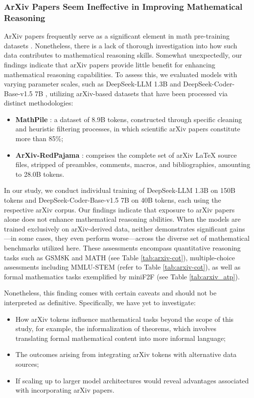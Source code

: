 \subsubsection{ArXiv Papers Seem Ineffective in Improving Mathematical Reasoning}

ArXiv papers frequently serve as a significant element in math pre-training datasets \citep{minerva,gpt-f,llemma,mathpile}. Nonetheless, there is a lack of thorough investigation into how such data contributes to mathematical reasoning skills. Somewhat unexpectedly, our findings indicate that arXiv papers provide little benefit for enhancing mathematical reasoning capabilities. To assess this, we evaluated models with varying parameter scales, such as DeepSeek-LLM 1.3B and DeepSeek-Coder-Base-v1.5 7B \citep{deepseek-coder}, utilizing arXiv-based datasets that have been processed via distinct methodologies:

\begin{itemize}[topsep=0pt]
    \item \textbf{MathPile} \citep{mathpile}: a dataset of 8.9B tokens, constructed through specific cleaning and heuristic filtering processes, in which scientific arXiv papers constitute more than 85\%;
    \item \textbf{ArXiv-RedPajama} \citep{redpajama}: comprises the complete set of arXiv LaTeX source files, stripped of preambles, comments, macros, and bibliographies, amounting to 28.0B tokens.
\end{itemize}

In our study, we conduct individual training of DeepSeek-LLM 1.3B on 150B tokens and DeepSeek-Coder-Base-v1.5 7B on 40B tokens, each using the respective arXiv corpus. Our findings indicate that exposure to arXiv papers alone does not enhance mathematical reasoning abilities. When the models are trained exclusively on arXiv-derived data, neither demonstrates significant gains—in some cases, they even perform worse—across the diverse set of mathematical benchmarks utilized here. These assessments encompass quantitative reasoning tasks such as GSM8K and MATH (see Table \ref{tab:arxiv-cot}), multiple-choice assessments including MMLU-STEM (refer to Table \ref{tab:arxiv-cot}), as well as formal mathematics tasks exemplified by miniF2F (see Table \ref{tab:arxiv_atp}).

Nonetheless, this finding comes with certain caveats and should not be interpreted as definitive. Specifically, we have yet to investigate:

\begin{itemize}[topsep=0pt]
    \item How arXiv tokens influence mathematical tasks beyond the scope of this study, for example, the informalization of theorems, which involves translating formal mathematical content into more informal language;
    \item The outcomes arising from integrating arXiv tokens with alternative data sources;
    \item If scaling up to larger model architectures would reveal advantages associated with incorporating arXiv papers.
\end{itemize}

